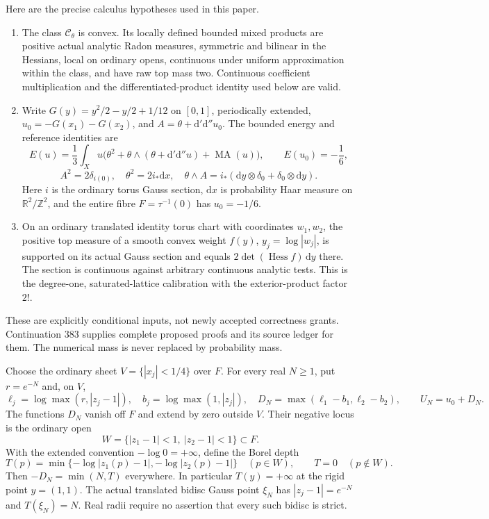 \documentclass[11pt]{article}
\newcommand{\MA}{\operatorname{MA}}
\newcommand{\DD}{\mathrm d'\mathrm d''}
\newcommand{\C}{\mathcal C_\theta}
\newcommand{\R}{\mathbb R}
\begin{document}
Here are the precise calculus hypotheses used in this paper.
\begin{enumerate}
\item The class $\C$ is convex. Its locally defined bounded mixed products
are positive actual analytic Radon measures, symmetric and bilinear in the
Hessians, local on ordinary opens, continuous under uniform approximation
within the class, and have raw top mass two. Continuous coefficient
multiplication and the differentiated-product identity used below are valid.
\item Write $G(y)=y^2/2-y/2+1/12$ on $[0,1]$, periodically extended,
$u_0=-G(x_1)-G(x_2)$, and $A=\theta+\DD u_0$.
The bounded energy and reference identities are
\[
 E(u)=\frac13\int_X u\bigl(\theta^2+\theta\wedge(\theta+\DD u)
                         +\MA(u)\bigr),\qquad E(u_0)=-\frac16,
\]
\[
 A^2=2\delta_{i(0)},\quad
 \theta^2=2i_*\mathrm dx,\quad
 \theta\wedge A=i_*(\mathrm dy\otimes\delta_0+
                                      \delta_0\otimes\mathrm dy).
\]
Here $i$ is the ordinary torus Gauss section, $\mathrm dx$ is probability
Haar measure on $\R^2/\mathbb Z^2$, and the entire fibre
$F=\tau^{-1}(0)$ has $u_0=-1/6$.
\item On an ordinary translated identity torus chart with coordinates
$w_1,w_2$, the positive top measure of a smooth convex weight $f(y)$,
$y_j=\log|w_j|$, is supported on its actual Gauss section and equals
$2\det(\operatorname{Hess} f)\,\mathrm dy$ there. The section is continuous
against arbitrary continuous analytic tests. This is the degree-one,
saturated-lattice calibration with the exterior-product factor $2!$.
\end{enumerate}
These are explicitly conditional inputs, not newly accepted correctness
grants. Continuation 383 supplies complete proposed proofs and its source
ledger for them. The numerical mass is never replaced by probability mass.

Choose the ordinary sheet $V=\{|x_j|<1/4\}$ over $F$. For every real $N\geq1$,
put $r=e^{-N}$ and, on $V$,
\[
 \ell_j=\log\max(r,|z_j-1|),\quad
 b_j=\log\max(1,|z_j|),\quad
 D_N=\max(\ell_1-b_1,\ell_2-b_2),\qquad U_N=u_0+D_N.
\]
The functions $D_N$ vanish off $F$ and extend by zero outside $V$.
Their negative locus is the ordinary open
\[
 W=\{|z_1-1|<1,\ |z_2-1|<1\}\subset F.
\]
With the extended convention $-\log0=+\infty$, define the Borel depth
\[
 T(p)=\min\{-\log|z_1(p)-1|,-\log|z_2(p)-1|\}\quad(p\in W),
 \qquad T=0\quad(p\notin W).
\]
Then $-D_N=\min(N,T)$ everywhere. In particular $T(y)=+\infty$ at the
rigid point $y=(1,1)$. The actual translated bidisc Gauss point $\xi_N$
has $|z_j-1|=e^{-N}$ and $T(\xi_N)=N$. Real radii require no assertion
that every such bidisc is strict.
\end{document}
